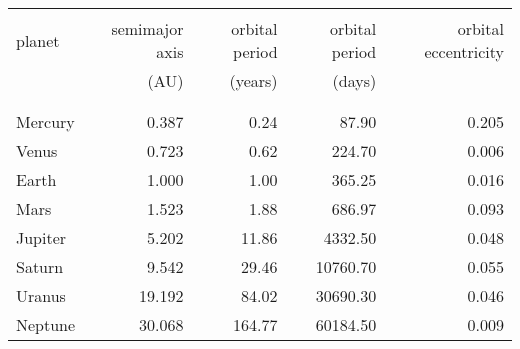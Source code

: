\normalsize{

	\begin{Table}
		\begin{tabular}{lrrrr} \hline\hline
			& & & & \\
			planet & semimajor axis & orbital period & orbital period &
			orbital eccentricity \\
			& (AU) & (years) & (days) & \\
			& & & & \\ \hline
			& & & & \\
			Mercury &  0.387 &   0.24 &    87.90 & 0.205 \\
			Venus   &  0.723 &   0.62 &   224.70 & 0.006 \\
			Earth   &  1.000 &   1.00 &   365.25 & 0.016 \\
			Mars    &  1.523 &   1.88 &   686.97 & 0.093 \\
			Jupiter &  5.202 &  11.86 &  4332.50 & 0.048 \\
			Saturn  &  9.542 &  29.46 & 10760.70 & 0.055 \\
			Uranus  & 19.192 &  84.02 & 30690.30 & 0.046 \\
			Neptune & 30.068 & 164.77 & 60184.50 & 0.009
			
		\end{tabular}
		\label{Table:params}	
	\end{Table}		
}
